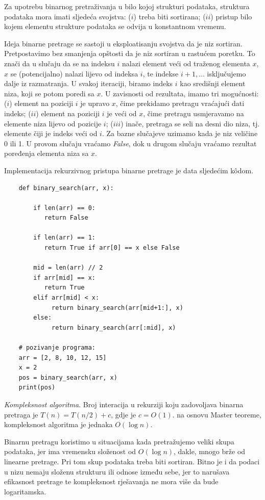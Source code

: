 Za upotrebu binarnog pretraživanja u bilo kojoj strukturi podataka, struktura podataka mora imati sljedeća svojstva: ($i$) treba biti sortirana; 
($ii$) pristup bilo kojem elementu strukture podataka se odvija u konstantnom vremenu.

Ideja binarne pretrage se sastoji u eksploatisanju svojstva da je niz sortiran. Pretpostavimo bez smanjenja opštosti da je niz sortiran u rastućem poretku. To znači da u slučaju da se na indeksu $i$ nalazi element veći od traženog elementa $x$, $x$ se (potencijalno) nalazi lijevo od indeksa $i$, te indekse $i+1, \ldots$ isključujemo dalje iz razmatranja. U svakoj iteraciji, biramo indeks $i$ kao središnji element niza, koji se potom poredi sa $x$. U zavisnosti od rezultata, imamo tri mogućnosti: ($i$) element na poziciji $i$ je upravo $x$, čime prekidamo pretragu vraćajući dati indeks; ($ii$)  element na poziciji $i$ je veći od $x$, čime pretragu usmjeravamo na elemente niza lijevo od pozicije $i$; ($iii$) inače, pretraga se seli na desni dio niza, tj. elemente čiji je indeks veći od $i$. Za bazne slučajeve uzimamo kada je niz veličine 0 ili 1. U provom slučaju vraćamo \textit{False}, dok u drugom slučaju vraćamo rezultat poređenja elementa niza sa $x$.  

Implementacija rekurzivnog pristupa binarne pretrage je data sljedećim k\^odom.

\begin{verbatim}
	def binary_search(arr, x):
	   
	    if len(arr) == 0:
	       return False
	        
	    if len(arr) == 1:
	       return True if arr[0] == x else False

	    mid = len(arr) // 2
	    if arr[mid] == x:
	       return True
	    elif arr[mid] < x:
	         return binary_search(arr[mid+1:], x)
	    else: 
	         return binary_search(arr[:mid], x)

    # pozivanje programa:
    arr = [2, 8, 10, 12, 15]
    x = 2
    pos = binary_search(arr, x)
    print(pos)
\end{verbatim} 

\textit{Kompleksnost algoritma}. Broj interacija u rekurziji koju zadovoljava binarna pretraga je $T(n) = T(n/2) + c$, gdje je $c=O(1)$. na osnovu Master teoreme, kompleksnost algoritma je jednaka $O(\log n)$. 

Binarnu pretragu koristimo u situacijama kada pretražujemo veliki skupa  podataka, jer ima vremensku složenost od $O(\log n)$, dakle, mnogo brže od linearne pretrage. Pri tom  skup podataka treba biti sortiran.
Bitno je i da podaci u nizu nemaju složenu strukturu ili odnose između sebe, jer to narušava efikasnost pretrage te kompleksnost rješavanja ne mora više da bude logaritamska.  

